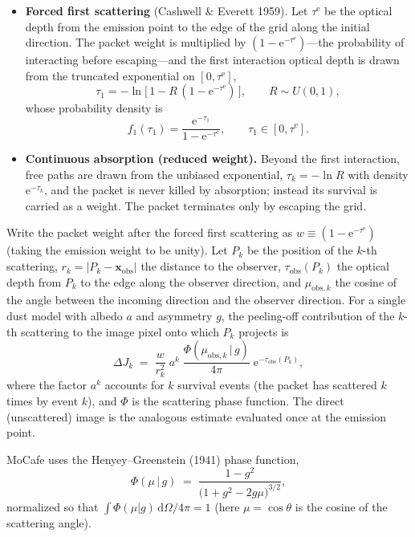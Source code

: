 \documentclass[english,a4paper]{kiseon_memo}
\newcommand{\rd}{\mathrm{d}}
\newcommand{\ee}{\mathrm{e}}
\newcommand{\obs}{\mathrm{obs}}
\newcommand{\edg}{\mathrm{e}}
\newcommand{\HG}{\Phi}
\begin{document}
\begin{itemize}
\item \textbf{Forced first scattering} (Cashwell \& Everett 1959).  Let
  $\tau^{\edg}$ be the optical depth from the emission point to the edge of the
  grid along the initial direction.  The packet weight is multiplied by
  $(1-\ee^{-\tau^{\edg}})$---the probability of interacting before escaping---and
  the first interaction optical depth is drawn from the truncated exponential on
  $[0,\tau^{\edg}]$,
  \begin{equation}
    \tau_1 = -\ln\!\big[\,1 - R\,(1-\ee^{-\tau^{\edg}})\,\big],
    \qquad R\sim U(0,1),
    \label{eq:forced}
  \end{equation}
  whose probability density is
  \begin{equation}
    f_1(\tau_1) = \frac{\ee^{-\tau_1}}{1-\ee^{-\tau^{\edg}}},
    \qquad \tau_1\in[0,\tau^{\edg}].
    \label{eq:fdens}
  \end{equation}
\item \textbf{Continuous absorption (reduced weight).}  Beyond the first
  interaction, free paths are drawn from the unbiased exponential,
  $\tau_k=-\ln R$ with density $\ee^{-\tau_k}$, and the packet is never killed by
  absorption; instead its survival is carried as a weight.  The packet
  terminates only by escaping the grid.
\end{itemize}

Write the packet weight after the forced first scattering as
$w \equiv (1-\ee^{-\tau^{\edg}})$ (taking the emission weight to be unity).  Let
$P_k$ be the position of the $k$-th scattering, $r_k=|P_k-\mathbf{x}_\obs|$ the
distance to the observer, $\tau_\obs(P_k)$ the optical depth from $P_k$ to the
edge along the observer direction, and $\mu_{\obs,k}$ the cosine of the angle
between the incoming direction and the observer direction.  For a single dust
model with albedo $a$ and asymmetry $g$, the peeling-off contribution of the
$k$-th scattering to the image pixel onto which $P_k$ projects is
\begin{equation}
  \Delta J_k \;=\; \frac{w}{r_k^2}\;a^{k}\;
  \frac{\HG(\mu_{\obs,k}\,|\,g)}{4\pi}\;\ee^{-\tau_\obs(P_k)} ,
  \label{eq:peel}
\end{equation}
where the factor $a^{k}$ accounts for $k$ survival events (the packet has
scattered $k$ times by event $k$), and $\HG$ is the scattering phase function.
The direct (unscattered) image is the analogous estimate evaluated once at the
emission point.

MoCafe uses the Henyey--Greenstein (1941) phase function,
\begin{equation}
  \HG(\mu\,|\,g) \;=\; \frac{1-g^2}{\big(1+g^2-2g\mu\big)^{3/2}},
  \label{eq:hg}
\end{equation}
normalized so that $\int \HG(\mu|g)\,\rd\Omega/4\pi = 1$ (here $\mu=\cos\theta$ is
the cosine of the scattering angle).
\end{document}
